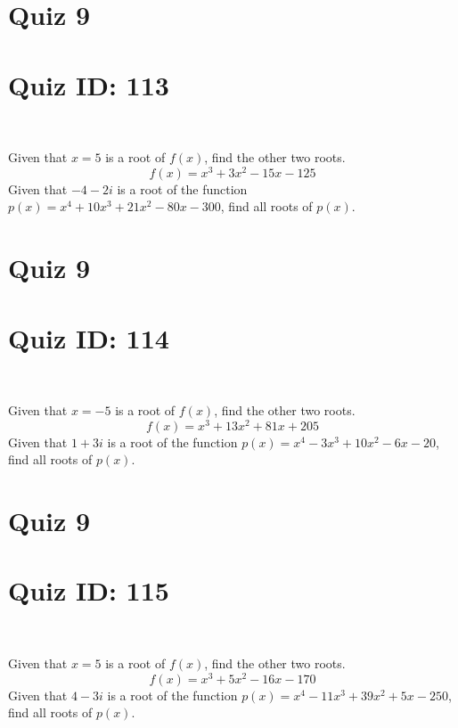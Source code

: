 \documentclass{exam}
\begin{document}
\section*{Quiz 9}
\section*{Quiz ID: 113}
\vspace{0.5cm}\
\vspace{1cm}\
\begin{questions}
\question Given that $x=5$ is a root of $f(x)$, find the other two roots.\[f(x)=
x^3 + 3x^2 - 15x - 125\]
\newpage
\question Given that $-4-2\mathit{i}$ is a root of the function $p(x)=
x^4 + 10x^3 + 21x^2 - 80x - 300$, find all roots of $p(x)$. 
\end{questions}\newpage
\newpage
\section*{Quiz 9}
\section*{Quiz ID: 114}
\vspace{0.5cm}\
\vspace{1cm}\
\begin{questions}
\question Given that $x=-5$ is a root of $f(x)$, find the other two roots.\[f(x)=
x^3 + 13x^2 + 81x + 205\]
\newpage
\question Given that $1+3\mathit{i}$ is a root of the function $p(x)=
x^4 - 3x^3 + 10x^2 - 6x - 20$, find all roots of $p(x)$. \makeemptybox{\stretch{1}}
\end{questions}\newpage
\newpage
\section*{Quiz 9}
\section*{Quiz ID: 115}
\vspace{0.5cm}\
\vspace{1cm}\
\begin{questions}
\question Given that $x=5$ is a root of $f(x)$, find the other two roots.\[f(x)=
x^3 + 5x^2 - 16x - 170\]
\newpage
\question Given that $4-3\mathit{i}$ is a root of the function $p(x)=
x^4 - 11x^3 + 39x^2 + 5x - 250$, find all roots of $p(x)$. \makeemptybox{\stretch{1}}
\end{questions}\newpage
\newpage
\end{document}
